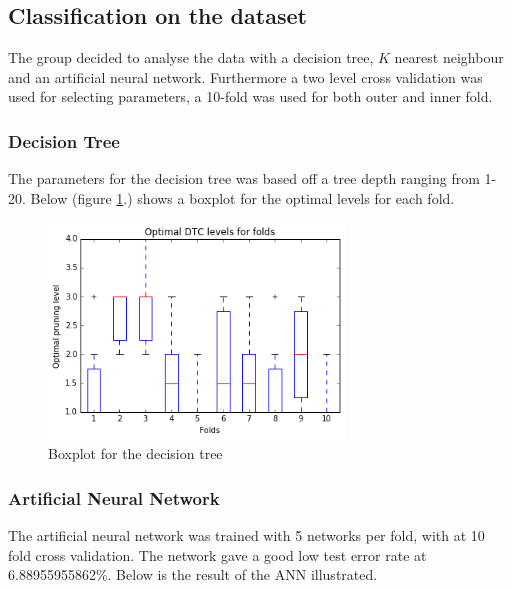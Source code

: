 \subsection{Classification on the dataset}
The group decided to analyse the data with a decision tree, $K$ nearest neighbour and an artificial neural network. Furthermore a two level cross validation was used for selecting parameters, a 10-fold was used for both outer and inner fold. \newline


\subsubsection{Decision Tree}
The parameters for the decision tree was based off a tree depth ranging from 1-20. Below (figure \ref{fig:classification_boxplot}.) shows a boxplot for the optimal levels for each fold. 

\vspace{-5pt}
\begin{figure}[!ht]
	\centering
	\includegraphics[width=0.7\textwidth]{Fig/classification_decision_tree}
	\vspace{-5pt}
	\caption{Boxplot for the decision tree}
	\label{fig:classification_boxplot}
\end{figure}

\subsubsection{Artificial Neural Network}
The artificial neural network was trained with 5 networks per fold, with at 10 fold cross validation. The network gave a good low test error rate at 6.88955955862\%. Below is the result of the ANN illustrated.

